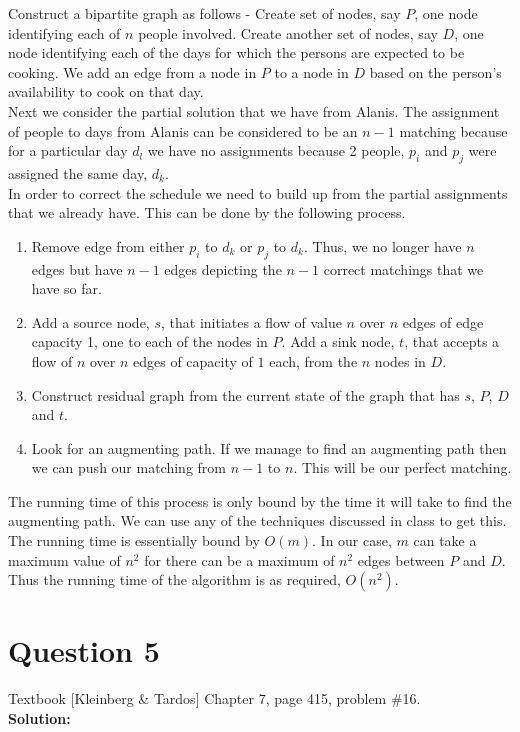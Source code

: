 \documentclass[11pt]{article}
\begin{document}
Construct a bipartite graph as follows - Create set of nodes, say $ P $, one node identifying each of $ n $ people involved. Create another set of nodes, say $ D $, one node identifying each of the days for which the persons are expected to be cooking. We add an edge from a node in $ P $ to a node in $ D $ based on the person's availability to cook on that day. \\

Next we consider the partial solution that we have from Alanis. The assignment of people to days from Alanis can be considered to be an $ n-1 $ matching because for a particular day $ d_l $ we have no assignments because 2 people, $ p_i $ and $ p_j $ were assigned the same day, $ d_k $. \\

In order to correct the schedule we need to build up from the partial assignments that we already have. This can be done by the following process.

\begin{enumerate}
	\item Remove edge from either $ p_i $ to $ d_k $ or $ p_j $ to $ d_k $. Thus, we no longer have $ n $ edges but have $ n-1 $ edges depicting the $ n-1 $ correct matchings that we have so far.
	\item Add a source node, $ s $, that initiates a flow of value $ n $ over $ n $ edges of edge capacity 1, one to each of the nodes in $ P $. Add a sink node, $ t $, that accepts a flow of $ n $ over $ n $ edges of capacity of $ 1 $ each, from the $ n $ nodes in $ D $.
	\item Construct residual graph from the current state of the graph that has $ s $, $ P $, $ D $ and $ t $.
	\item Look for an augmenting path. If we manage to find an augmenting path then we can push our matching from $ n-1 $ to $ n $. This will be our perfect matching.
\end{enumerate}

The running time of this process is only bound by the time it will take to find the augmenting path. We can use any of the techniques discussed in class to get this. The running time is essentially bound by $ O(m) $. In our case, $ m $ can take a maximum value of $ n^2 $ for there can be a maximum of $ n^2 $ edges between $ P $ and $ D $. Thus the running time of the algorithm is as required, $ O(n^2) $.

\clearpage
\section{Question 5} Textbook [Kleinberg \& Tardos] Chapter 7, page 415, problem \#16. \\
\textbf{Solution:} \\
\end{document}
